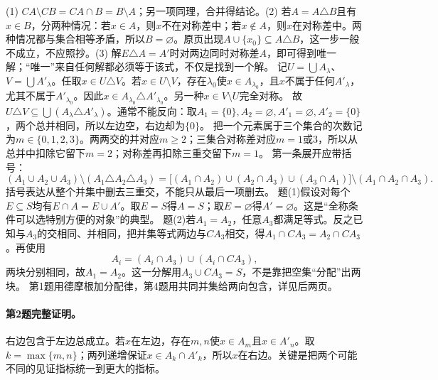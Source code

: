 (1) $CA\setminus CB=CA\cap B=B\setminus A$；另一项同理，合并得结论。(2) 若$A=A\triangle B$且有$x\in B$，分两种情况：若$x\in A$，则$x$不在对称差中；若$x\notin A$，则$x$在对称差中。两种情况都与集合相等矛盾，所以$B=\varnothing$。原页出现$A\cup\{x_0\}\subseteq A\triangle B$，这一步一般不成立，不应照抄。(3) 解$E\triangle A=A'$时对两边同时对称差$A$，即可得到唯一解；“唯一”来自任何解都必须等于该式，不仅是找到一个解。
记$U=\bigcup A_\lambda$、$V=\bigcup A'_\lambda$。任取$x\in U\triangle V$。若$x\in U\setminus V$，存在$\lambda_0$使$x\in A_{\lambda_0}$，且$x$不属于任何$A'_\lambda$，尤其不属于$A'_{\lambda_0}$。因此$x\in A_{\lambda_0}\triangle A'_{\lambda_0}$。另一种$x\in V\setminus U$完全对称。
故$U\triangle V\subseteq\bigcup(A_\lambda\triangle A'_\lambda)$。通常不能反向：取$A_1=\{0\},A_2=\varnothing,A'_1=\varnothing,A'_2=\{0\}$，两个总并相同，所以左边空，右边却为$\{0\}$。
把一个元素属于三个集合的次数记为$m\in\{0,1,2,3\}$。两两交的并对应$m\ge2$；三集合对称差对应$m=1$或3，所以从总并中扣除它留下$m=2$；对称差再扣除三重交留下$m=1$。
第一条展开应带括号：
\[(A_1\cup A_2\cup A_3)\setminus(A_1\triangle A_2\triangle A_3)=\bigl[(A_1\cap A_2)\cup(A_2\cap A_3)\cup(A_3\cap A_1)\bigr]\setminus(A_1\cap A_2\cap A_3).\]
括号表达从整个并集中删去三重交，不能只从最后一项删去。
题(1)假设对每个$E\subseteq S$均有$E\cap A=E\cup A'$。取$E=S$得$A=S$；取$E=\varnothing$得$A'=\varnothing$。这是“全称条件可以选特别方便的对象”的典型。
题(2)若$A_1=A_2$，任意$A_3$都满足等式。反之已知与$A_3$的交相同、并相同，把并集等式两边与$CA_3$相交，得$A_1\cap CA_3=A_2\cap CA_3$。再使用
\[A_i=(A_i\cap A_3)\cup(A_i\cap CA_3),\]
两块分别相同，故$A_1=A_2$。这一分解用$A_3\cup CA_3=S$，不是靠把空集“分配”出两块。
第1题用德摩根加分配律，第4题用共同并集给两向包含，详见后两页。
\paragraph{第2题完整证明。}右边包含于左边总成立。若$x$在左边，存在$m,n$使$x\in A_m$且$x\in A'_n$。取$k=\max\{m,n\}$；两列递增保证$x\in A_k\cap A'_k$，所以$x$在右边。关键是把两个可能不同的见证指标统一到更大的指标。
